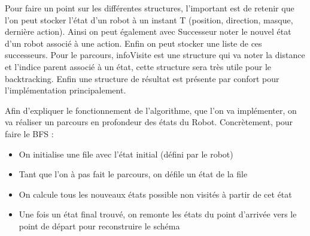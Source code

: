 \vspace{1cm}

\begin{algorithme}



\end{algorithme}
\vspace{0.5cm}
Pour faire un point sur les différentes structures, l'important est de retenir que l'on peut stocker l'état d'un robot à un instant T (position, direction, masque, dernière action). Ainsi on peut également avec Successeur noter le nouvel état d'un robot associé à une action. Enfin on peut stocker une liste de ces successeurs. Pour le parcours, infoVisite est une structure qui va noter la distance et l'indice parent associé à un état,  cette structure sera très utile pour le backtracking. Enfin une structure de résultat est présente par confort pour l'implémentation principalement.

\vspace{0.5cm}
\noindent Afin d’expliquer le fonctionnement de l’algorithme, que l'on va implémenter, on va réaliser un parcours en profondeur des états du Robot. Concrètement, pour faire le BFS :
\begin{itemize}
    \item On initialise une file avec l'état initial (défini par le robot)
    \item Tant que l'on à pas fait le parcours, on défile un état de la file
    \item On calcule tous les nouveaux états possible non visités à partir de cet état
    \item Une fois un état final trouvé, on remonte les états du point d'arrivée vers le point de départ pour reconstruire le schéma
\end{itemize}

